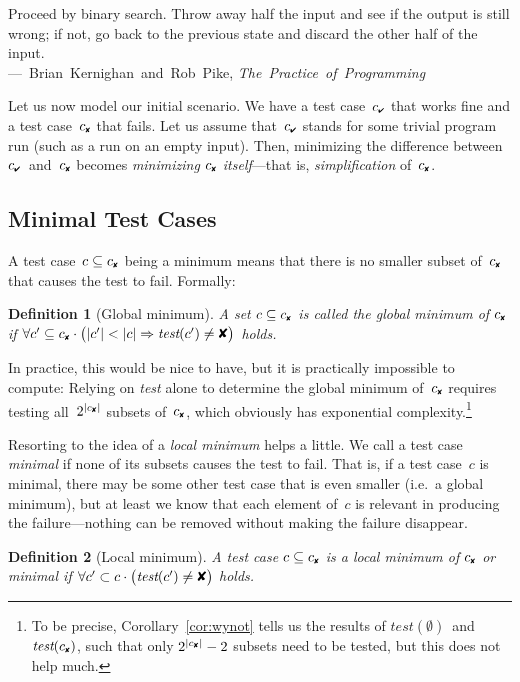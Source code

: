 \documentclass{acm_proc_article-sp}
\newcommand{\PASS}{\text{\ding{52}}\xspace}
\newcommand{\FAIL}{\text{\ding{56}}\xspace}
\newcommand{\cpass}{{c_{\scriptscriptstyle \PASS}}}
\newcommand{\cfail}{{c_{\scriptscriptstyle \FAIL}}}
\newcommand{\test}{\textit{test}\xspace}
\newenvironment{Quote}{%
\smallskip
\begin{minipage}[t]{\columnwidth}
\begin{flushright}%
\itshape%
\samepage%
}{\end{flushright}\end{minipage}\par}
\newcommand{\By}[2]{\\[1mm]---~\mbox{\textnormal{#1}} \mbox{\textsl{#2}}}
\theoremstyle{plain}
\newtheorem{definition}{Definition}
\let\oldfootnote=\footnote
\renewcommand{\footnote}[1]{\oldfootnote{\let\small=\scriptsize #1}}
\begin{document}
\begin{Quote}
  Proceed by binary search.  Throw away half the input and see if the
  output is still wrong; if not, go back to the previous state and
  discard the other half of the input.
\By{Brian Kernighan and Rob Pike,}{The Practice of Programming}
\end{Quote}

Let us now model our initial scenario.  We have a test case~$\cpass$
that works fine and a test case~$\cfail$ that fails.  Let us assume
that~$\cpass$ stands for some trivial program run (such as a run on an
empty input).  Then, minimizing the difference between
$\cpass$~and~$\cfail$ becomes \emph{minimizing $\cfail$ itself}---that
is, \emph{simplification} of~$\cfail$.

\subsection{Minimal Test Cases}

A test case~$c \subseteq \cfail$ being a minimum means that there is no
smaller subset of~$\cfail$ that causes the test to fail.  Formally:

\begin{definition}[Global minimum]
\label{def:global-minimum}
A set $c \subseteq \cfail$ is called the \emph{global minimum} of $\cfail$ if\:
$
\forall c' \subseteq \cfail \cdot \bigl(|c'| < |c| \Rightarrow \test(c') \neq \FAIL\bigr)
$
holds.
\end{definition}

In practice, this would be nice to have, but it is practically
impossible to compute: Relying on \test alone to determine the global
minimum of~$\cfail$ requires testing all~$2^{|\cfail|}$ subsets
of~$\cfail$, which obviously has exponential complexity.\footnote{To
  be precise, Corollary~\ref{cor:wynot} tells us the results of
  $\test(\emptyset)$~and~$\test(\cfail)$, such that only $2^{|\cfail|} - 2$
  subsets need to be tested, but this does not help much.}

Resorting to the idea of a \emph{local minimum} helps a little.  We
call a test case \emph{minimal} if none of its subsets causes the test
to fail.  That is, if a test case~$c$ is minimal, there may be some
other test case that is even smaller (i.e.\ a global minimum), but at
least we know that each element of~$c$ is relevant in producing the
failure---nothing can be removed without making the failure disappear.

\begin{definition}[Local minimum]
\label{def:minimal-test-case}
A test case $c \subseteq \cfail$ is a \emph{local minimum} of $\cfail$ or 
\emph{minimal} if\:
$
\forall c' \subset c \cdot \bigl(\test(c') \neq \FAIL\bigr)
$
holds.
\end{definition}
\end{document}
